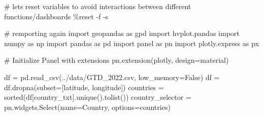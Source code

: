 \documentclass[
  letterpaper,
  DIV=11,
  numbers=noendperiod]{scrreprt}
\newenvironment{Shaded}{\begin{snugshade}}{\end{snugshade}}
\newcommand{\BuiltInTok}[1]{\textcolor[rgb]{0.00,0.23,0.31}{#1}}
\newcommand{\CommentTok}[1]{\textcolor[rgb]{0.37,0.37,0.37}{#1}}
\newcommand{\ImportTok}[1]{\textcolor[rgb]{0.00,0.46,0.62}{#1}}
\newcommand{\NormalTok}[1]{\textcolor[rgb]{0.00,0.23,0.31}{#1}}
\newcommand{\OperatorTok}[1]{\textcolor[rgb]{0.37,0.37,0.37}{#1}}
\newcommand{\StringTok}[1]{\textcolor[rgb]{0.13,0.47,0.30}{#1}}
\newcommand{\VariableTok}[1]{\textcolor[rgb]{0.07,0.07,0.07}{#1}}
\begin{document}
\begin{Shaded}
\begin{Highlighting}[]
\CommentTok{\# let\textquotesingle{}s reset variables to avoid interactions between different functions/dashboards}
\OperatorTok{\%}\NormalTok{reset }\OperatorTok{{-}}\NormalTok{f }\OperatorTok{{-}}\NormalTok{s}

\CommentTok{\# remporting again}
\ImportTok{import}\NormalTok{ geopandas }\ImportTok{as}\NormalTok{ gpd}
\ImportTok{import}\NormalTok{ hvplot.pandas}
\ImportTok{import}\NormalTok{ numpy }\ImportTok{as}\NormalTok{ np}
\ImportTok{import}\NormalTok{ pandas }\ImportTok{as}\NormalTok{ pd}
\ImportTok{import}\NormalTok{ panel }\ImportTok{as}\NormalTok{ pn}
\ImportTok{import}\NormalTok{ plotly.express }\ImportTok{as}\NormalTok{ px}

\CommentTok{\# Initialize Panel with extensions}
\NormalTok{pn.extension(}\StringTok{\textquotesingle{}plotly\textquotesingle{}}\NormalTok{, design}\OperatorTok{=}\StringTok{\textquotesingle{}material\textquotesingle{}}\NormalTok{)}
\end{Highlighting}
\end{Shaded}

\begin{Shaded}
\begin{Highlighting}[]
\NormalTok{df }\OperatorTok{=}\NormalTok{ pd.read\_csv(}\StringTok{\textquotesingle{}../data/GTD\_2022.csv\textquotesingle{}}\NormalTok{, low\_memory}\OperatorTok{=}\VariableTok{False}\NormalTok{)}
\NormalTok{df }\OperatorTok{=}\NormalTok{ df.dropna(subset}\OperatorTok{=}\NormalTok{[}\StringTok{\textquotesingle{}latitude\textquotesingle{}}\NormalTok{, }\StringTok{\textquotesingle{}longitude\textquotesingle{}}\NormalTok{])}
\NormalTok{countries }\OperatorTok{=} \BuiltInTok{sorted}\NormalTok{(df[}\StringTok{\textquotesingle{}country\_txt\textquotesingle{}}\NormalTok{].unique().tolist())}
\NormalTok{country\_selector }\OperatorTok{=}\NormalTok{ pn.widgets.Select(name}\OperatorTok{=}\StringTok{\textquotesingle{}Country\textquotesingle{}}\NormalTok{, options}\OperatorTok{=}\NormalTok{countries)}
\end{Highlighting}
\end{Shaded}
\end{document}
